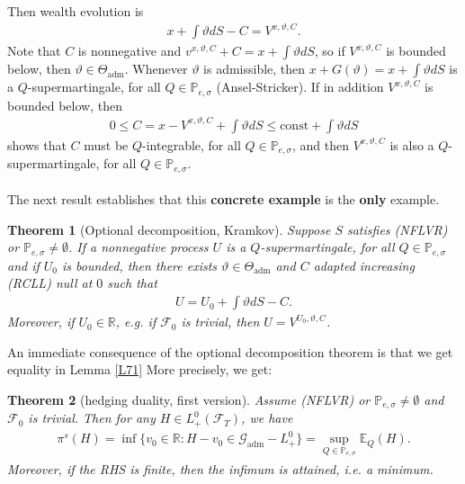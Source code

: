 \documentclass[12pt,a4paper, twoside]{article}
\newtheorem{thm}{Theorem}[section]
\theoremstyle{definition}
\newcommand{\EE}{\mathbb{E}} %
\newcommand{\PP}{\mathbb{P}} %
\begin{document}
\newpage
Then wealth evolution is 
\begin{align*}
x + \int \vartheta dS -C = V^{x, \vartheta,C}.
\end{align*}
Note that $C$ is nonnegative and $v^{x, \vartheta, C} + C = x + \int \vartheta dS$, so if $V^{x, \vartheta,C}$ is bounded below, then $\vartheta \in \Theta_\text{adm}$. Whenever $\vartheta$ is admissible, then $x + G( \vartheta) = x + \int \vartheta dS$ is a $Q$-supermartingale, for all $Q \in \PP_{e, \sigma}$ (Ansel-Stricker). If in addition $V^{x, \vartheta, C}$ is bounded below, then
\begin{align*}
0 \leq C = x- V^{x, \vartheta, C} + \int \vartheta dS \leq \text{const} + \int \vartheta dS
\end{align*}
shows that $C$ must be $Q$-integrable, for all $Q \in \PP_{e,  \sigma}$, and then $V^{x, \vartheta,C}$ is also a $Q$-supermartingale, for all $Q \in \PP_{e, \sigma}$. 
\\
\\
The next result establishes that this \textbf{concrete example} is the \textbf{only} example.
\begin{thm}[Optional decomposition, Kramkov] \label{T73} Suppose $S$ satisfies (NFLVR) or $\PP_{e, \sigma} \neq \emptyset$. If a nonnegative process $U$ is a $Q$-supermartingale, for all $Q \in \PP_{e, \sigma}$ and if $U_0$ is bounded, then there exists $\vartheta \in \Theta_\text{adm}$ and $C$ adapted increasing (RCLL) null at $0$ such that 
\begin{align*}
U = U_0 + \int \vartheta dS -C. 
\end{align*}
Moreover, if $U_0 \in \mathbb{R}$, e.g. if $\mathcal{F}_0$ is trivial, then $U= V^{U_0, \vartheta, C}$. 
\end{thm}
An immediate consequence of the optional decomposition theorem is that we get equality in Lemma \ref{L71} More precisely, we get:
\begin{thm}[hedging duality, first version] \label{T74} Assume (NFLVR) or $\PP_{e, \sigma} \neq \emptyset$ and $\mathcal{F}_0$ is trivial. Then for any $H \in L_+^0( \mathcal{F}_T)$, we have
\begin{align*}
\pi^s(H) = \inf\{ v_0 \in \mathbb{R}: H-v_0 \in \mathcal{G}_\text{adm}-L_+^0 \} = \sup_{Q \in \PP_{e, \sigma}} \EE_Q(H). 
\end{align*}
Moreover, if the RHS is finite, then the infimum is attained, i.e. a minimum. 
\end{thm}
\end{document}
